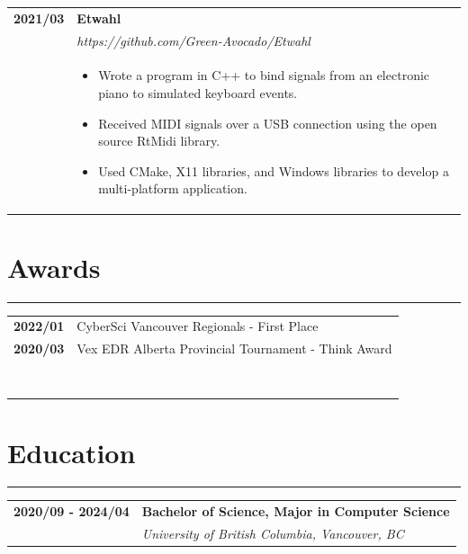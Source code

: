 \documentclass[letterpaper]{article}
\newcommand{\sectcolor}{cyan}
\newcommand{\sect}[1]{\section*{#1}
                        {\color{\sectcolor}
                        \rule{\textwidth}{1pt}
                        \vspace{-1ex}}}
\begin{document}
        \begin{tabular}{p{} p{}}
            \textbf{2021/03} & \textbf{Etwahl} \\
            & \emph{https://github.com/Green-Avocado/Etwahl} \\
            & \begin{itemize}
                \item Wrote a program in C++ to bind signals from an electronic piano to simulated
                    keyboard events.
                \item Received MIDI signals over a USB connection using the open source RtMidi library.
                \item Used CMake, X11 libraries, and Windows libraries to develop a multi-platform
                    application.
            \end{itemize}
        \end{tabular}

    \sect{Awards}

        \begin{tabular}{p{} p{}}
            \textbf{2022/01} & CyberSci Vancouver Regionals - First Place \\
            \textbf{2020/03} & Vex EDR Alberta Provincial Tournament - Think Award \\

            \\\\\\\\\\\\\\\\
        \end{tabular}

    \sect{Education}

        \begin{tabular}{p{} p{}}
            \textbf{2020/09 - 2024/04} & \large\textbf{Bachelor of Science, Major in Computer Science} \\
            & \emph{University of British Columbia, Vancouver, BC} \\
        \end{tabular}
\end{document}
